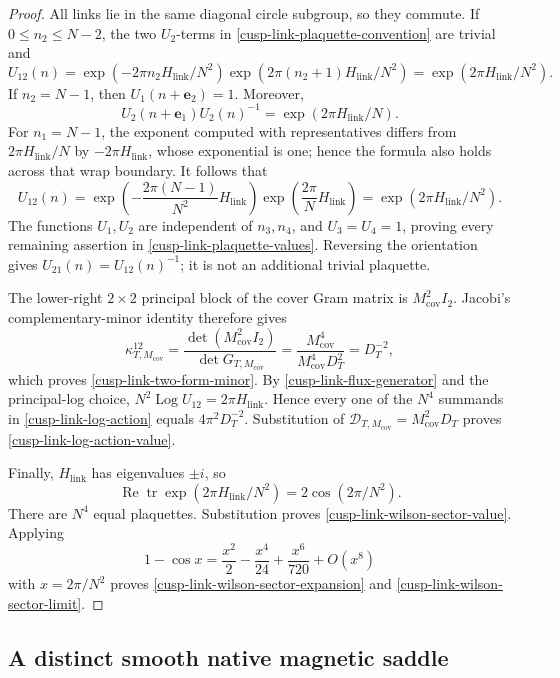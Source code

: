 \documentclass[11pt]{article}
\theoremstyle{definition}
\numberwithin{equation}{section}
\begin{document}
\begin{proof}
All links lie in the same diagonal circle subgroup, so they commute.  If
\(0\leq n_2\leq N-2\), the two \(U_2\)-terms in
\eqref{cusp-link-plaquette-convention} are trivial and
\[
 U_{12}(n)=
 \exp(-2\pi n_2H_{\mathrm{link}}/N^2)
 \exp(2\pi(n_2+1)H_{\mathrm{link}}/N^2)
 =\exp(2\pi H_{\mathrm{link}}/N^2).
\]
If \(n_2=N-1\), then \(U_1(n+\mathbf e_2)=1\).  Moreover,
\[
 U_2(n+\mathbf e_1)U_2(n)^{-1}=\exp(2\pi H_{\mathrm{link}}/N).
\]
For \(n_1=N-1\), the exponent computed with representatives differs from
\(2\pi H_{\mathrm{link}}/N\) by \(-2\pi H_{\mathrm{link}}\), whose exponential is one; hence the formula
also holds across that wrap boundary.  It follows that
\[
 U_{12}(n)=
 \exp\left(-\frac{2\pi(N-1)}{N^2}H_{\mathrm{link}}\right)
 \exp\left(\frac{2\pi}{N}H_{\mathrm{link}}\right)
 =\exp(2\pi H_{\mathrm{link}}/N^2).
\]
The functions \(U_1,U_2\) are independent of \(n_3,n_4\), and
\(U_3=U_4=1\), proving every remaining assertion in
\eqref{cusp-link-plaquette-values}.  Reversing the orientation gives
\(U_{21}(n)=U_{12}(n)^{-1}\); it is not an additional trivial plaquette.

The lower-right \(2\times2\) principal block of the cover Gram matrix is
\(M_{\mathrm{cov}}^2I_2\).  Jacobi's
complementary-minor identity therefore gives
\[
 \kappa^{12}_{T,M_{\mathrm{cov}}}
 =\frac{\det(M_{\mathrm{cov}}^2I_2)}
        {\det G_{T,M_{\mathrm{cov}}}}
 =\frac{M_{\mathrm{cov}}^4}{M_{\mathrm{cov}}^4D_T^2}
 =D_T^{-2},
\]
which proves \eqref{cusp-link-two-form-minor}.  By
\eqref{cusp-link-flux-generator} and the principal-log choice,
\(N^2\operatorname{Log}U_{12}=2\pi H_{\mathrm{link}}\).  Hence every one of the \(N^4\)
summands in \eqref{cusp-link-log-action} equals
\(4\pi^2D_T^{-2}\).  Substitution of
\(\mathcal D_{T,M_{\mathrm{cov}}}=M_{\mathrm{cov}}^2D_T\) proves
\eqref{cusp-link-log-action-value}.

Finally, \(H_{\mathrm{link}}\) has eigenvalues \(\pm i\), so
\[
 \operatorname{Re}\operatorname{tr}\exp(2\pi H_{\mathrm{link}}/N^2)
 =2\cos(2\pi/N^2).
\]
There are \(N^4\) equal plaquettes.  Substitution proves
\eqref{cusp-link-wilson-sector-value}.  Applying
\[
 1-\cos x=\frac{x^2}{2}-\frac{x^4}{24}
           +\frac{x^6}{720}+O(x^8)
\]
with \(x=2\pi/N^2\) proves
\eqref{cusp-link-wilson-sector-expansion} and
\eqref{cusp-link-wilson-sector-limit}.
\end{proof}

\subsection{A distinct smooth native magnetic saddle}
\label{cusp-link-smooth-magnetic-saddle-section}
\end{document}
